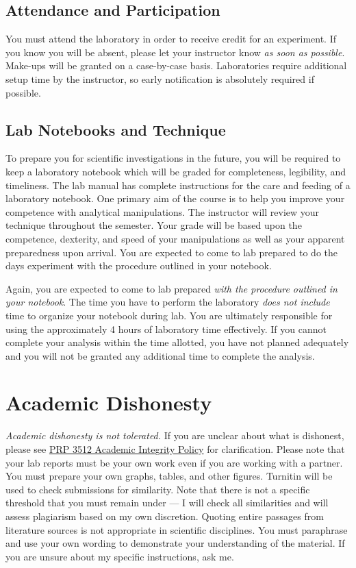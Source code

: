 \documentclass[11pt,letterpaper]{article}
\begin{document}
\subsection{Attendance and Participation}
You must attend the laboratory in order to receive credit for an experiment. If
you know you will be absent, please let your instructor know \emph{as soon as
possible}. Make-ups will be granted on a case-by-case basis. Laboratories
require additional setup time by the instructor, so early notification is
absolutely required if possible.

\subsection{Lab Notebooks and Technique}
To prepare you for scientific investigations in the future, you will be
required to keep a laboratory notebook which will be graded for completeness,
legibility, and timeliness. The lab manual has
complete instructions for the care and feeding of a laboratory notebook.  One
primary aim of the course is to help you improve your competence with
analytical manipulations.  The instructor will review your technique throughout
the semester. Your grade will be based upon the competence, dexterity, and
speed of your manipulations as well as your apparent preparedness upon arrival.
You are expected to come to lab prepared to do the days experiment with the
procedure outlined in your notebook.

\begin{mdframed}
	Again, you are expected to come to lab prepared \emph{with the procedure
	outlined in your notebook}. The time you have to perform the laboratory
	\emph{does not include} time to organize your notebook during lab. You
	are ultimately responsible for using the approximately 4 hours of
	laboratory time effectively. If you cannot complete your analysis within
	the time allotted, you have not planned adequately and you will not be
	granted any additional time to complete the analysis.
\end{mdframed}

\section{Academic Dishonesty}
\emph{Academic dishonesty is not tolerated.} If you are unclear about what is
dishonest, please see 
\href{https://www.bloomu.edu/prp-3512-academic-integrity-policy}{PRP 3512
Academic Integrity Policy} for clarification. Please note that your lab reports
must be your own work even if you are working with a partner. You must prepare
your own graphs, tables, and other figures.
Turnitin\texttrademark{} will be used to check submissions for similarity. Note
that there is not a specific threshold that you must remain under --- I will check
all similarities and will assess plagiarism based on my own discretion. Quoting
entire passages from literature sources is not appropriate in scientific
disciplines. You must paraphrase and use your own wording to demonstrate your
understanding of the material. If you are unsure
about my specific instructions, ask me.
\end{document}

